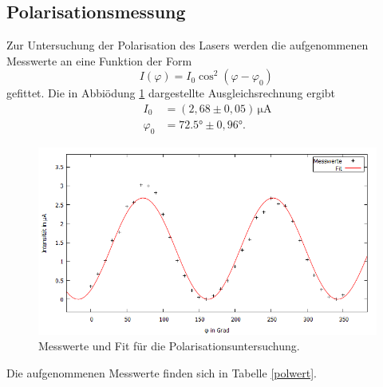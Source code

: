 \subsection{Polarisationsmessung}
Zur Untersuchung der Polarisation des Lasers werden die aufgenommenen Messwerte an eine Funktion der Form
\begin{equation}
   I(\varphi) = I_0 \cos^2\!\left(\varphi-\varphi_0\right)\,
\end{equation}
gefittet. Die in Abbiödung \ref{polfit} dargestellte Ausgleichsrechnung ergibt
\begin{align*}
 I_0 &=(2,68 \pm 0,05)\, \si{\micro\ampere}\\
 \varphi_0 &=72.5° \pm 0,96°.
\end{align*}
\begin{figure}[H]
  \centering
  \includegraphics[width=14cm]{bilder/polarplot.png}
  \caption{Messwerte und Fit für die Polarisationsuntersuchung.}
  \label{polfit}
\end{figure}
Die aufgenommenen Messwerte finden sich in Tabelle \ref{polwert}.
